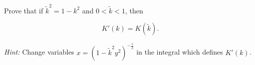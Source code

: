Prove that if $\tilde{k}^2 = 1 - k^2$ and $0 < \tilde{k} < 1$, then

$$
K'(k) = K(\tilde{k}).
$$

\textit{Hint:} Change variables $x = \left(1 - \tilde{k}^2 y^2\right)^{-\frac{1}{2}}$ in the integral which defines $K'(k)$.

\begin{solution}
  \ \\
\end{solution}